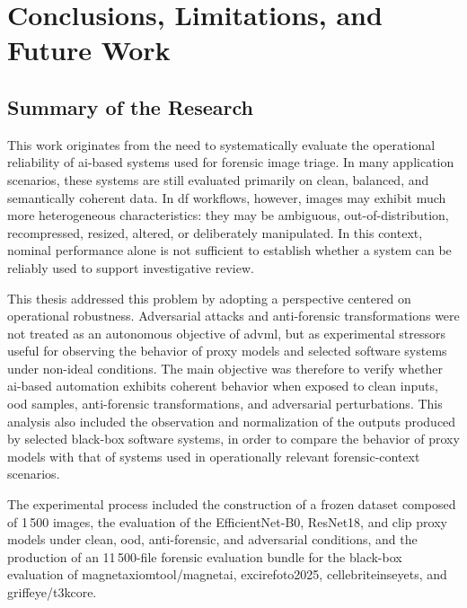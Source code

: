 \chapter{Conclusions, Limitations, and Future Work}
\label{chap:conclusions}

\section{Summary of the Research}
\label{sec:conclusions-summary}

This work originates from the need to systematically evaluate the operational
reliability of \gls{ai}-based systems used for forensic image triage. In many
application scenarios, these systems are still evaluated primarily on clean,
balanced, and semantically coherent data. In \gls{df} workflows, however, images
may exhibit much more heterogeneous characteristics: they may be ambiguous,
out-of-distribution, recompressed, resized, altered, or deliberately
manipulated. In this context, nominal performance alone is not sufficient to
establish whether a system can be reliably used to support investigative
review.

This thesis addressed this problem by adopting a perspective centered on
operational robustness. Adversarial attacks and anti-forensic transformations
were not treated as an autonomous objective of \gls{advml}, but as experimental
stressors useful for observing the behavior of proxy models and selected
software systems under non-ideal conditions. The main objective was therefore
to verify whether \gls{ai}-based automation exhibits coherent behavior when
exposed to clean inputs, \gls{ood} samples, anti-forensic transformations, and
adversarial perturbations. This analysis also included the observation and
normalization of the outputs produced by selected black-box software systems,
in order to compare the behavior of proxy models with that of systems used in
operationally relevant forensic-context scenarios.

The experimental process included the construction of a frozen dataset composed
of 1\,500 images, the evaluation of the EfficientNet-B0, ResNet18, and
\gls{clip} proxy models under clean, \gls{ood}, anti-forensic, and adversarial
conditions, and the production of an 11\,500-file forensic evaluation bundle
for the black-box evaluation of \gls{magnetaxiomtool}/\gls{magnetai},
\gls{excirefoto2025}, \gls{cellebriteinseyets}, and
\gls{griffeye}/\gls{t3kcore}.

